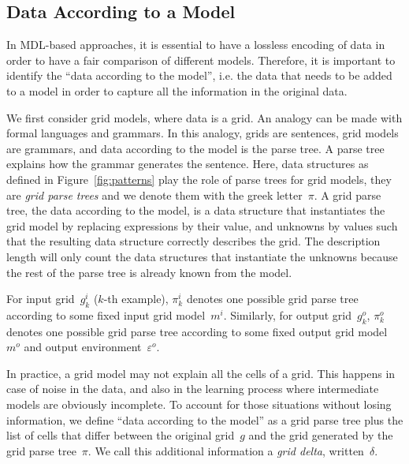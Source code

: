 \documentclass[a4paper]{llncs}
\newcommand{\KILL}[1]{}
\newcommand{\nat}{\mathbb{N}}
\begin{document}
\subsection{Data According to a Model}
\label{data}

In MDL-based approaches, it is essential to have a lossless encoding
of data in order to have a fair comparison of different
models. Therefore, it is important to identify the ``data according to
the model'', i.e. the data that needs to be added to a model in order
to capture all the information in the original data.

We first consider grid models, where data is a grid. An analogy can be
made with formal languages and grammars. In this analogy, grids are
sentences, grid models are grammars, and data according to the model
is the parse tree. A parse tree explains how the grammar generates the
sentence. Here, data structures as defined in
Figure~\ref{fig:patterns} play the role of parse trees for grid
models, they are {\em grid parse trees} and we denote them with the
greek letter~$\pi$. A grid parse tree, the data according to the
model, is a data structure that instantiates the grid model by
replacing expressions by their value, and unknowns by values such that
the resulting data structure correctly describes the grid. The
description length will only count the data structures that
instantiate the unknowns because the rest of the parse tree is already
known from the model.

For input grid~$g^i_k$ ($k$-th example), $\pi^i_k$ denotes one
possible grid parse tree according to some fixed input grid
model~$m^i$. Similarly, for output grid~$g^o_k$, $\pi^o_k$ denotes one
possible grid parse tree according to some fixed output grid
model~$m^o$ and output environment~$\varepsilon^o$.

In practice, a grid model may not explain all the cells of a
grid. This happens in case of noise in the data, and also in the
learning process where intermediate models are obviously
incomplete. To account for those situations without losing
information, we define ``data according to the model'' as a grid parse
tree plus the list of cells that differ between the original grid~$g$
and the grid generated by the grid parse tree~$\pi$. We call this
additional information a {\em grid delta}, written~$\delta$.
\KILL{Formally, a grid
delta is a set of triples~$(i,j,c) \in \nat \times \nat \times C$
stating that the cell at coordinates~$(i,j)$ has color~$c$ in~$g$,
which is different from the color specified by~$\pi$.}
\end{document}
